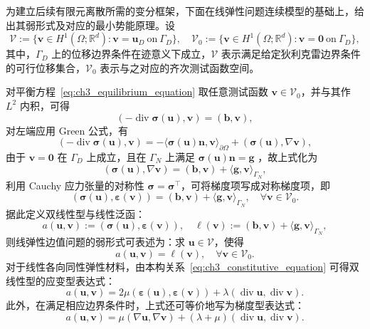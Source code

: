 为建立后续有限元离散所需的变分框架，下面在线弹性问题连续模型的基础上，给出其弱形式及对应的最小势能原理。设
\[
\mathcal{V} :=\{\boldsymbol{v}\in{H}^1(\Omega;\mathbb{R}^d):\boldsymbol{v} = \boldsymbol{u}_D~\text{on}~{\Gamma_D}\},\quad\mathcal{V}_0 := \{\boldsymbol{v}\in{H}^1(\Omega;\mathbb{R}^d):\boldsymbol{v} = \boldsymbol{0}~\text{on}~{\Gamma_D}\},
\]
其中，$\Gamma_D$ 上的位移边界条件在迹意义下成立，$\mathcal{V}$ 表示满足给定狄利克雷边界条件的可行位移集合，$\mathcal{V}_0$ 表示与之对应的齐次测试函数空间。

对平衡方程~\eqref{eq:ch3_equilibrium_equation} 取任意测试函数 $\boldsymbol{v}\in\mathcal{V}_0$，并与其作 $L^2$ 内积，可得
\[
(-\operatorname{div}\boldsymbol{\sigma}(\boldsymbol{u}),\boldsymbol{v}) = (\boldsymbol{b},\boldsymbol{v}),
\]
对左端应用 Green 公式，有
\[
(-\operatorname{div}\boldsymbol{\sigma}(\boldsymbol{u}),\boldsymbol{v}) = -\langle\boldsymbol{\sigma}(\boldsymbol{u})\boldsymbol{n},\boldsymbol{v}\rangle_{\partial\Omega} + (\boldsymbol{\sigma}(\boldsymbol{u}),\nabla\boldsymbol{v}),
\]
由于 $\boldsymbol{v}=\boldsymbol{0}$ 在 $\Gamma_D$ 上成立，且在 $\Gamma_N$ 上满足 $\boldsymbol{\sigma}(\boldsymbol{u})\boldsymbol{n} = \boldsymbol{g}$ ，故上式化为
\[
(\boldsymbol{\sigma}(\boldsymbol{u}),\nabla\boldsymbol{v}) = (\boldsymbol{b},\boldsymbol{v}) + \langle\boldsymbol{g},\boldsymbol{v}\rangle_{\Gamma_N},
\]
利用 Cauchy 应力张量的对称性 $\boldsymbol{\sigma}=\boldsymbol{\sigma}^{\top}$，可将梯度项写成对称梯度项，即
\[
(\boldsymbol{\sigma}(\boldsymbol{u}),\boldsymbol{\varepsilon}(\boldsymbol{v})) = (\boldsymbol{b},\boldsymbol{v}) + \langle\boldsymbol{g},\boldsymbol{v}\rangle_{\Gamma_N},\quad\forall\boldsymbol{v}\in\mathcal{V}_0.
\]
据此定义双线性型与线性泛函：
\begin{equation} \label{eq:ch3_bilinear_linear_forms}
	a(\boldsymbol{u},\boldsymbol{v}) := (\boldsymbol{\sigma}(\boldsymbol{u}),\boldsymbol{\varepsilon}(\boldsymbol{v})),\quad\ell(\boldsymbol{v}) := (\boldsymbol{b},\boldsymbol{v}) + \langle\boldsymbol{g},\boldsymbol{v}\rangle_{\Gamma_N},
\end{equation}
则线弹性边值问题的弱形式可表述为：求 $\boldsymbol{u}\in\mathcal{V}$，使得
\begin{equation} \label{eq:ch3_elastic_weak_form}
	a(\boldsymbol{u},\boldsymbol{v}) = \ell(\boldsymbol{v}),\quad\forall\boldsymbol{v}\in\mathcal{V}_0.
\end{equation}
对于线性各向同性弹性材料，由本构关系~\eqref{eq:ch3_constitutive_equation} 可得双线性型的应变型表达式：
\[
	a(\boldsymbol{u},\boldsymbol{v}) = 2\mu(\boldsymbol{\varepsilon}(\boldsymbol{u}),\boldsymbol{\varepsilon}(\boldsymbol{v})) + \lambda(\operatorname{div}\boldsymbol{u},\operatorname{div}\boldsymbol{v}).
\]
此外，在满足相应边界条件时，上式还可等价地写为梯度型表达式：
\[
a(\boldsymbol{u},\boldsymbol{v}) = \mu(\nabla\boldsymbol{u},\nabla\boldsymbol{v}) + (\lambda+\mu)(\operatorname{div}\boldsymbol{u},\operatorname{div}\boldsymbol{v}).
\]

